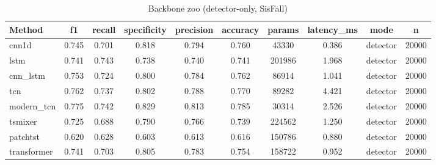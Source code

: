 \begin{table}[t]
\centering
\caption{Backbone zoo (detector-only, SisFall)}
\begin{tabular}{lccccccccc}
\toprule
Method & f1 & recall & specificity & precision & accuracy & params & latency_ms & mode & n \\
\midrule
cnn1d & 0.745 & 0.701 & 0.818 & 0.794 & 0.760 & 43330 & 0.386 & detector & 20000 \\
lstm & 0.741 & 0.743 & 0.738 & 0.740 & 0.741 & 201986 & 1.968 & detector & 20000 \\
cnn_lstm & 0.753 & 0.724 & 0.800 & 0.784 & 0.762 & 86914 & 1.041 & detector & 20000 \\
tcn & 0.762 & 0.737 & 0.802 & 0.788 & 0.770 & 89282 & 4.421 & detector & 20000 \\
modern_tcn & 0.775 & 0.742 & 0.829 & 0.813 & 0.785 & 30314 & 2.526 & detector & 20000 \\
tsmixer & 0.725 & 0.688 & 0.790 & 0.766 & 0.739 & 224562 & 1.250 & detector & 20000 \\
patchtst & 0.620 & 0.628 & 0.603 & 0.613 & 0.616 & 150786 & 0.880 & detector & 20000 \\
transformer & 0.741 & 0.703 & 0.805 & 0.783 & 0.754 & 158722 & 0.952 & detector & 20000 \\
\bottomrule
\end{tabular}
\end{table}
